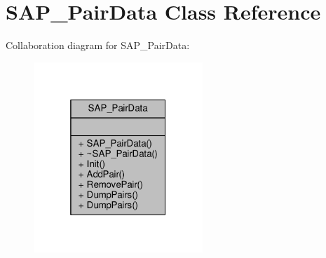 \hypertarget{classSAP__PairData}{}\section{S\+A\+P\+\_\+\+Pair\+Data Class Reference}
\label{classSAP__PairData}


Collaboration diagram for S\+A\+P\+\_\+\+Pair\+Data\+:
\nopagebreak
\begin{figure}[H]
\begin{center}
\leavevmode
\includegraphics[width=181pt]{d4/d4a/classSAP__PairData__coll__graph}
\end{center}
\end{figure}
